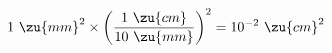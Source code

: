 \begin{equation*}
1\ \zu{mm}^2 \times \left(\frac{1\ \zu{cm}}{10\ \zu{mm}}\right)^2 = 10^{-2}\ \zu{cm}^2
\end{equation*}



